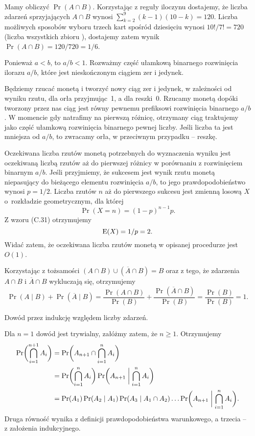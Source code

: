 Mamy obliczyć $\Pr(A\cap B)$. Korzystając z reguły iloczynu dostajemy, że liczba zdarzeń sprzyjających $A\cap B$ wynosi $\sum_{k=2}^9(k-1)(10-k)=120$. Liczba możliwych sposobów wyboru trzech kart spośród dziesięciu wynosi $10!/7!=720$ (liczba wszystkich  zbioru ), dostajemy zatem wynik $\Pr(A\cap B)=120/720=1/6$.

\exercise{} %
Ponieważ $a<b$, to $a/b<1$. Rozważmy część ułamkową binarnego rozwinięcia ilorazu $a/b$, które jest nieskończonym ciągiem zer i jedynek.

Będziemy rzucać monetą i tworzyć nowy ciąg zer i jedynek, w zależności od wyniku rzutu, dla orła przyjmując~1, a dla reszki~0. Rzucamy monetą dopóki tworzony przez nas ciąg jest równy pewnemu prefiksowi rozwinięcia binarnego $a/b$. W momencie gdy natrafimy na pierwszą różnicę, otrzymany ciąg traktujemy jako część ułamkową rozwinięcia binarnego pewnej liczby. Jeśli liczba ta jest mniejsza od $a/b$, to zwracamy orła, w przeciwnym przypadku -- reszkę.

Oczekiwana liczba rzutów monetą potrzebnych do wyznaczenia wyniku jest oczekiwaną liczbą rzutów aż do pierwszej różnicy w porównaniu z rozwinięciem binarnym $a/b$. Jeśli przyjmiemy, że sukcesem jest wynik rzutu monetą niepasujący do bieżącego elementu rozwinięcia $a/b$, to jego prawdopodobieństwo wynosi $p=1/2$. Liczba rzutów $n$ aż do pierwszego sukcesu jest zmienną losową $X$ o~rozkładzie geometrycznym, dla której
\[
	\Pr(X=n) = (1-p)^{n-1}p.
\]
Z wzoru (C.31) otrzymujemy
\[
	\operatorname{E}(X) = 1/p = 2.
\]
Widać zatem, że oczekiwana liczba rzutów monetą w opisanej procedurze jest $O(1)$.

\exercise{} %
Korzystając z tożsamości $(A\cap B)\cup(\overline{A}\cap B)=B$ oraz z tego, że zdarzenia $A\cap B$ i $\overline{A}\cap B$ wykluczają się, otrzymujemy
\[
	\Pr(A\mid B)+\Pr(\overline{A}\mid B) = \frac{\Pr(A\cap B)}{\Pr(B)}+\frac{\Pr(\overline{A}\cap B)}{\Pr(B)} = \frac{\Pr(B)}{\Pr(B)} = 1.
\]

\exercise{} %
Dowód przez indukcję względem liczby zdarzeń.

Dla $n=1$ dowód jest trywialny, załóżmy zatem, że $n\ge1$. Otrzymujemy
\begin{align*}
	\Pr\biggl(\bigcap_{i=1}^{n+1}A_i\biggr) &= \Pr\biggl(A_{n+1}\cap\bigcap_{i=1}^nA_i\biggr) \\
	&= \Pr\biggl(\bigcap_{i=1}^nA_i\biggr)\Pr\biggl(A_{n+1}\biggm|\bigcap_{i=1}^nA_i\biggr) \\
	&= \Pr(A_1)\Pr(A_2\mid A_1)\Pr(A_3\mid A_1\cap A_2)\dots\Pr\biggl(A_{n+1}\biggm|\bigcap_{i=1}^nA_i\biggr).
\end{align*}
Druga równość wynika z definicji prawdopodobieństwa warunkowego, a trzecia -- z założenia indukcyjnego.


